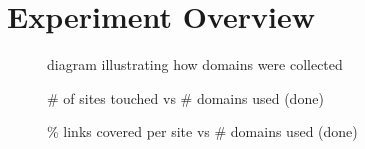\section{Experiment Overview} \label{oversky}

\begin{figure}
    \caption{diagram illustrating how domains were collected}
\end{figure}

\begin{figure}
    \caption{\# of sites touched vs \# domains used (done)}
\end{figure}

\begin{figure}
    \caption{\% links covered per site vs \# domains used (done)}
\end{figure}



